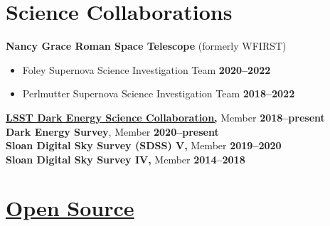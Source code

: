 \documentclass[margin]{res}
\begin{document}
\begin{resume}
\section{Science Collaborations}
{\bf Nancy Grace Roman Space Telescope} (formerly WFIRST)
\begin{itemize}\itemsep -2pt
 \item[] Foley Supernova Science Investigation Team \hfill {\bf 2020--2022}
 \item[] Perlmutter Supernova Science Investigation Team \hfill {\bf 2018--2022}
\end{itemize} \vspace{-12pt}
{\bf \href{http://www.lsst-desc.org}{LSST Dark Energy Science Collaboration,}} Member \hfill {\bf 2018--present}
\\
{\bf Dark Energy Survey}, Member \hfill {\bf 2020--present}\\
{\bf Sloan Digital Sky Survey (SDSS) V,} Member \hfill {\bf 2019--2020}\\
{\bf Sloan Digital Sky Survey IV,} Member \hfill {\bf 2014--2018}





\section{\href{https://github.com/benjaminrose}{Open Source}}


\end{resume}
\end{document}
